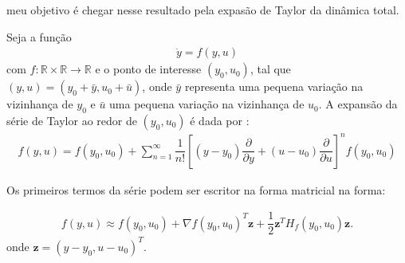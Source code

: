 \documentclass[12pt,a4paper]{article}
\begin{document}
meu objetivo é chegar nesse resultado pela expasão de Taylor da dinâmica total.

Seja a função
\begin{align}
  \label{eq:ode-geral}
\dot{y}=f(y,u)
\end{align}
com \(f:\mathbb{R}\times\mathbb{R}\to\mathbb{R}\) e o ponto de interesse \((y_{0},u_{0})\), tal que \((y,u)=(y_{0}+\bar{y}, u_{0}+\bar{u})\), onde \(\bar{y}\) representa uma pequena variação na vizinhança de \(y_{0}\) e \(\bar{u}\) uma pequena variação na vizinhança de \(u_{0}\). A expansão da série de Taylor ao redor de \((y_{0}, u_{0})\) é dada por \cite{CalculoVol22021}:
\begin{align}
  f(y,u)=f(y_{0},u_{0})+\sum_{n=1}^{\infty}\dfrac{1}{n!}\left[(y-y_{0})\dfrac{\partial}{\partial y} + (u-u_{0})\dfrac{\partial}{\partial u}\right]^{n}f(y_{0},u_{0})
  \label{eq:serie-taylor-f-escalar}
\end{align}

Os  primeiros termos da série podem ser escritor na forma matricial na forma:

\begin{align}
  f(y,u) \approx f(y_{0},u_{0}) + \nabla f(y_{0},u_{0})^{T}\mathbf{z} + \dfrac{1}{2} \mathbf{z}^{T}H_{f}(y_{0},u_{0})\mathbf{z}.
  \label{eq:serie-taylor-vetorial}
\end{align}
onde \(\mathbf{z}=(y-y_{0},u-u_{0})^{T}\).
\end{document}
